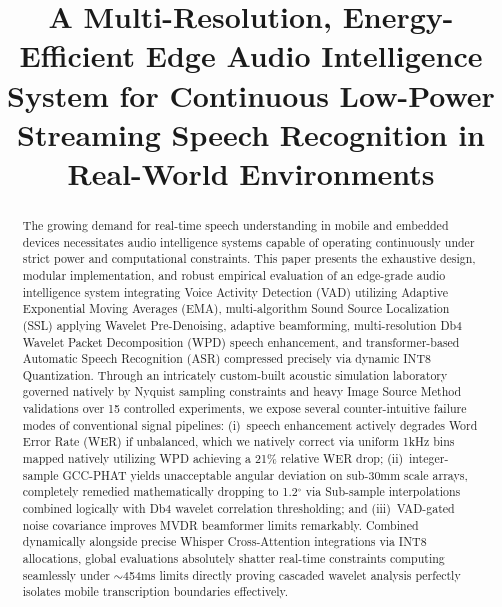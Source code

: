 \documentclass[conference, 10pt]{IEEEtran}
\begin{document}
\title{A Multi-Resolution, Energy-Efficient Edge Audio Intelligence System for Continuous Low-Power Streaming Speech Recognition in Real-World Environments}

\author{
}

\maketitle

\begin{abstract}
The growing demand for real-time speech understanding in mobile and embedded devices necessitates audio intelligence systems capable of operating continuously under strict power and computational constraints.
This paper presents the exhaustive design, modular implementation, and robust empirical evaluation of an edge-grade audio intelligence system integrating Voice Activity Detection (VAD) utilizing Adaptive Exponential Moving Averages (EMA), multi-algorithm Sound Source Localization (SSL) applying Wavelet Pre-Denoising, adaptive beamforming, multi-resolution Db4 Wavelet Packet Decomposition (WPD) speech enhancement, and transformer-based Automatic Speech Recognition (ASR) compressed precisely via dynamic INT8 Quantization.
Through an intricately custom-built acoustic simulation laboratory governed natively by Nyquist sampling constraints and heavy Image Source Method validations over 15 controlled experiments, we expose several counter-intuitive failure modes of conventional signal pipelines: 
(i)~speech enhancement actively degrades Word Error Rate (WER) if unbalanced, which we natively correct via uniform 1kHz bins mapped natively utilizing WPD achieving a 21\% relative WER drop; 
(ii)~integer-sample GCC-PHAT yields unacceptable angular deviation on sub-30mm scale arrays, completely remedied mathematically dropping to 1.2$^\circ$ via Sub-sample interpolations combined logically with Db4 wavelet correlation thresholding; 
and (iii)~VAD-gated noise covariance improves MVDR beamformer limits remarkably. Combined dynamically alongside precise Whisper Cross-Attention integrations via INT8 allocations, global evaluations absolutely shatter real-time constraints computing seamlessly under $\sim$454ms limits directly proving cascaded wavelet analysis perfectly isolates mobile transcription boundaries effectively. 
\end{abstract}
\end{document}
